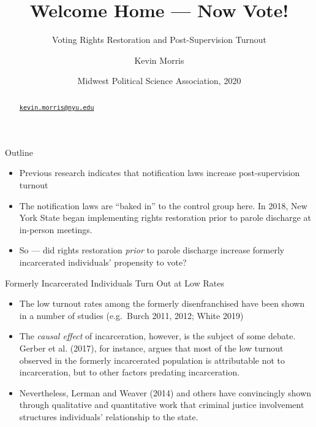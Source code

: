 \documentclass[
  ignorenonframetext,
]{beamer}
\title{Welcome Home --- Now Vote!}
\subtitle{Voting Rights Restoration and Post-Supervision Turnout}
\author{Kevin Morris}
\date{Midwest Political Science Association, 2020}
\institute{Brennan Center for Justice}
\providecommand{\tightlist}{%
  \setlength{\itemsep}{0pt}\setlength{\parskip}{0pt}}
\begin{document}
\frame{\titlepage}
\begin{abstract}
\href{mailto:kevin.morris@nyu.edu}{\nolinkurl{kevin.morris@nyu.edu}}
\end{abstract}

\begin{frame}{Outline}
\protect\hypertarget{outline}{}
\begin{itemize}[<+->]
\tightlist
\item
  Previous research indicates that notification laws increase
  post-supervision turnout
\end{itemize}

\begin{itemize}[<+->]
\tightlist
\item
  The notification laws are ``baked in'' to the control group here. In
  2018, New York State began implementing rights restoration prior to
  parole discharge at in-person meetings.
\end{itemize}

\begin{itemize}[<+->]
\tightlist
\item
  So --- did rights restoration \emph{prior} to parole discharge
  increase formerly incarcerated individuals' propensity to vote?
\end{itemize}
\end{frame}

\begin{frame}{Formerly Incarcerated Individuals Turn Out at Low Rates}
\protect\hypertarget{formerly-incarcerated-individuals-turn-out-at-low-rates}{}
\begin{itemize}[<+->]
\tightlist
\item
  The low turnout rates among the formerly disenfranchised have been
  shown in a number of studies (e.g.~Burch 2011, 2012; White 2019)
\end{itemize}

\begin{itemize}[<+->]
\tightlist
\item
  The \emph{causal effect} of incarceration, however, is the subject of
  some debate. Gerber et al. (2017), for instance, argues that most of
  the low turnout observed in the formerly incarcerated population is
  attributable not to incarceration, but to other factors predating
  incarceration.
\end{itemize}

\begin{itemize}[<+->]
\tightlist
\item
  Nevertheless, Lerman and Weaver (2014) and others have convincingly
  shown through qualitative and quantitative work that criminal justice
  involvement structures individuals' relationship to the state.
\end{itemize}
\end{frame}
\end{document}
